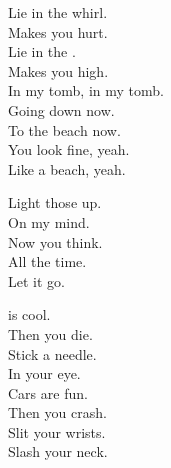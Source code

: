 


Lie in the whirl. \\
Makes you hurt. \\
Lie in the . \\
Makes you high. \\
In my tomb, in my tomb. \\

Going down now. \\
To the beach now. \\
You look fine, yeah. \\
Like a beach, yeah. \\




Light those up. \\
On my mind. \\
Now you think. \\
All the time. \\

Let it go. \\




 is cool. \\
Then you die. \\
Stick a needle. \\
In your eye. \\
Cars are fun. \\
Then you crash. \\
Slit your wrists. \\
Slash your neck. \\
